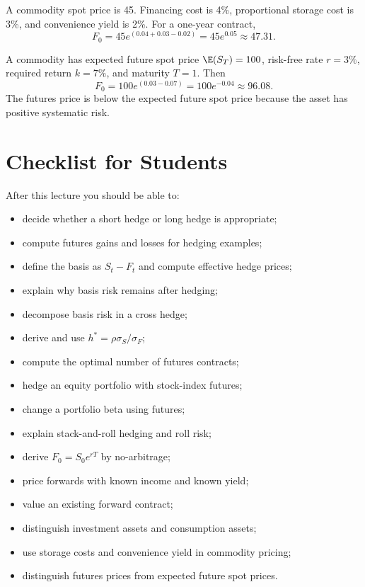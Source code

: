 \begin{exmp}
A commodity spot price is 45. Financing cost is 4\%, proportional storage cost
is 3\%, and convenience yield is 2\%. For a one-year contract,
\[
    F_0=45e^{(0.04+0.03-0.02)}
    =
    45e^{0.05}
    \approx 47.31.
\]
\end{exmp}

\begin{exmp}
A commodity has expected future spot price $\E(S_T)=100$, risk-free rate
$r=3\%$, required return $k=7\%$, and maturity $T=1$. Then
\[
    F_0=100e^{(0.03-0.07)}
    =
    100e^{-0.04}
    \approx 96.08.
\]
The futures price is below the expected future spot price because the asset has
positive systematic risk.
\end{exmp}

\section{Checklist for Students}

After this lecture you should be able to:
\begin{itemize}
    \item decide whether a short hedge or long hedge is appropriate;
    \item compute futures gains and losses for hedging examples;
    \item define the basis as $S_t-F_t$ and compute effective hedge prices;
    \item explain why basis risk remains after hedging;
    \item decompose basis risk in a cross hedge;
    \item derive and use $h^*=\rho\sigma_S/\sigma_F$;
    \item compute the optimal number of futures contracts;
    \item hedge an equity portfolio with stock-index futures;
    \item change a portfolio beta using futures;
    \item explain stack-and-roll hedging and roll risk;
    \item derive $F_0=S_0e^{rT}$ by no-arbitrage;
    \item price forwards with known income and known yield;
    \item value an existing forward contract;
    \item distinguish investment assets and consumption assets;
    \item use storage costs and convenience yield in commodity pricing;
    \item distinguish futures prices from expected future spot prices.
\end{itemize}

